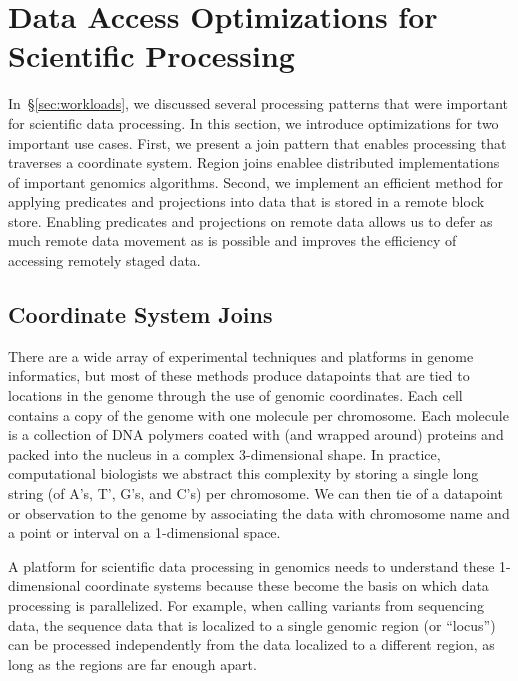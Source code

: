 \documentclass{acm_proc_article-sp}
\begin{document}
\section{Data Access Optimizations for \\ Scientific Processing}
\label{sec:optimizations-scientific-processing}

In~\S\ref{sec:workloads}, we discussed several processing patterns that were important for scientific
data processing. In this section, we introduce optimizations for two important use cases. First, we present
a join pattern that enables processing that traverses a coordinate system. Region joins enablee distributed
implementations of important genomics algorithms. Second, we implement an efficient method for
applying predicates and projections into data that is stored in a remote block store. Enabling predicates
and projections on remote data allows us to defer as much remote data movement as is possible and
improves the efficiency of accessing remotely staged data.

\subsection{Coordinate System Joins}
\label{sec:coordinate-system-joins}

There are a wide array of experimental techniques and platforms in genome informatics, but most of these
methods produce datapoints that are tied to locations in the genome through the use of genomic coordinates.
Each cell contains a copy of the genome with one molecule per chromosome. Each molecule is a collection of
DNA polymers coated with (and wrapped around) proteins and packed into the nucleus in a complex
3-dimensional shape. In practice, computational biologists we abstract this complexity by storing a single long
string (of A's, T', G's, and C's) per chromosome. We can then tie of a datapoint or observation to the genome by
associating the data with chromosome name and a point or interval on a 1-dimensional space.

A platform for scientific data processing in genomics needs to understand these 1-dimensional coordinate
systems because these become the basis on which data processing is parallelized. For example, when calling
variants from sequencing data, the sequence data that is localized to a single genomic region (or ``locus'') can be 
processed independently from the data localized to a different region, as long as the regions are far enough
apart.
\end{document}
